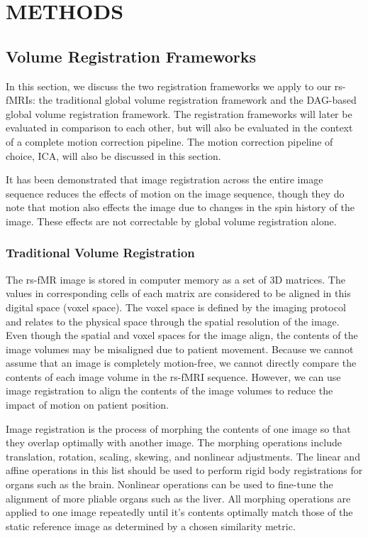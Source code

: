 \chapter{METHODS}
\label{ch:methods}

\section{Volume Registration Frameworks}

In this section, we discuss the two registration frameworks we apply to our rs-fMRIs: the traditional global volume registration framework and the DAG-based global volume registration framework. The registration frameworks will later be evaluated in comparison to each other, but will also be evaluated in the context of a complete motion correction pipeline. The motion correction pipeline of choice, ICA, will also be discussed in this section.

It has been demonstrated that image registration across the entire image sequence reduces the effects of motion on the image sequence, though they do note that motion also effects the image due to changes in the spin history of the image. These effects are not correctable by global volume registration alone. %

\subsection{Traditional Volume Registration}

The rs-fMR image is stored in computer memory as a set of 3D matrices. The values in corresponding cells of each matrix are considered to be aligned in this digital space (voxel space). The voxel space is defined by the imaging protocol and relates to the physical space through the spatial resolution of the image. Even though the spatial and voxel spaces for the image align, the contents of the image volumes may be misaligned due to patient movement. Because we cannot assume that an image is completely motion-free, we cannot directly compare the contents of each image volume in the rs-fMRI sequence. However, we can use image registration to align the contents of the image volumes to reduce the impact of motion on patient position.

Image registration is the process of morphing the contents of one image so that they overlap optimally with another image. The morphing operations include translation, rotation, scaling, skewing, and nonlinear adjustments. The linear and affine operations in this list should be used to perform rigid body registrations for organs such as the brain. Nonlinear operations can be used to fine-tune the alignment of more pliable organs such as the liver. All morphing operations are applied to one image repeatedly until it's contents optimally match those of the static reference image as determined by a chosen similarity metric. 

